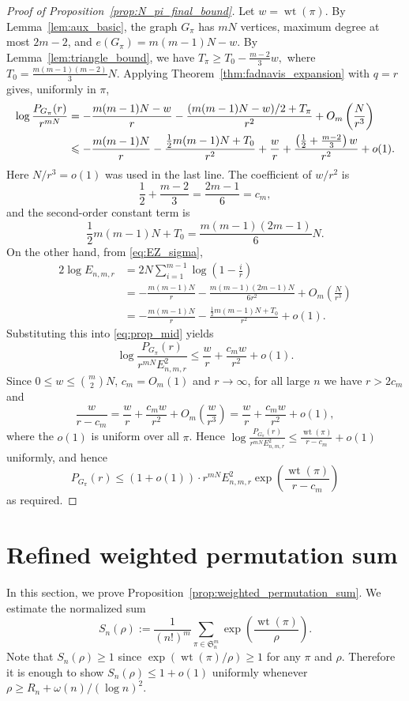 \documentclass[11pt,reqno]{amsart}
\theoremstyle{definition}
\theoremstyle{remark}
\renewcommand\leq{\leqslant}
\renewcommand\geq{\geqslant}
\renewcommand\le{\leqslant}
\renewcommand\ge{\geqslant}
\renewcommand\to{\rightarrow}
\newcommand{\wt}{\operatorname{wt}}
\begin{document}
\begin{proof}[Proof of Proposition~\ref{prop:N_pi_final_bound}]
Let $w=\wt(\pi)$. By Lemma~\ref{lem:aux_basic}, the graph $G_\pi$ has $mN$ vertices, maximum degree at most $2m-2$, and $e(G_\pi)=m(m-1)N-w.$
By Lemma~\ref{lem:triangle_bound}, we have $T_\pi\geq T_0-\frac{m-2}{3}w,$ where $T_0=\frac{m(m-1)(m-2)}3N$.
Applying Theorem~\ref{thm:fadnavis_expansion} with $q=r$ gives, uniformly in $\pi$,
\begin{align}
\log\frac{P_{G_\pi}(r)}{r^{mN}}
&=-\frac{m(m-1)N-w}{r}
  -\frac{(m(m-1)N-w)/2+T_\pi}{r^2}
  +O_m\left(\frac N{r^3}\right) \notag\\
&\leq
  -\frac{m(m-1)N}{r}
  -\frac{\frac12m(m-1)N+T_0}{r^2}
  +\frac wr+\frac{\left(\frac12+\frac{m-2}{3}\right)w}{r^2}
  +o(1). \label{eq:prop_mid}
\end{align}
Here $N/r^3=o(1)$ was used in the last line. The coefficient of $w/r^2$ is
\[
        \frac12+\frac{m-2}{3}=\frac{2m-1}{6}=c_m,
\]
and the second-order constant term is
\[
        \frac12m(m-1)N+T_0
        =\frac{m(m-1)(2m-1)}6N.
\]
On the other hand, from \eqref{eq:EZ_sigma},
\begin{align*}
2\log E_{n,m,r}
&=2N\sum_{i=1}^{m-1} \log\left(1-\frac ir\right)\\
&=-\frac{m(m-1)N}{r}
  -\frac{m(m-1)(2m-1)N}{6r^2}
  +O_m\left(\frac N{r^3}\right)\\
&=-\frac{m(m-1)N}{r}
  -\frac{\frac12m(m-1)N+T_0}{r^2}
  +o(1).
\end{align*}
Substituting this into \eqref{eq:prop_mid} yields
\[
        \log\frac{P_{G_\pi}(r)}{r^{mN}E_{n,m,r}^2}
        \leq \frac wr+\frac{c_mw}{r^2}+o(1).
\]
Since $0\leq w\leq\binom m2N$, $c_m=O_m(1)$ and $r\to\infty$, for all large $n$ we have $r>2c_m$ and
\[
\frac{w}{r-c_m}
=\frac wr+\frac{c_mw}{r^2}+O_m\left(\frac{w}{r^3}\right)
=\frac wr+\frac{c_mw}{r^2}+o(1),
\]
where the $o(1)$ is uniform over all $\pi$. Hence
$\log\frac{P_{G_\pi}(r)}{r^{mN}E_{n,m,r}^2}
 \le \frac{\wt(\pi)}{r-c_m}+o(1)$ uniformly, and hence
$$P_{G_\pi}(r)\le (1+o(1))\cdot r^{mN}E_{n,m,r}^2
\exp\left(\frac{\wt(\pi)}{r-c_m}\right)$$
as required.
\end{proof}
\medskip

\section{Refined weighted permutation sum}\label{sec:weighted_permutation_sum}

In this section, we prove Proposition~\ref{prop:weighted_permutation_sum}. We estimate the normalized sum
\begin{equation}\label{eq:core_sum}
        S_n(\rho):=\frac1{(n!)^m}
        \sum_{\pi\in\mathfrak S_n^m}\exp\left(\frac{\wt(\pi)}\rho\right).
\end{equation}
Note that $S_n(\rho)\geq 1$ since $\exp(\wt(\pi)/\rho)\geq1$ for any $\pi$ and $\rho$. Therefore it is enough to show 
$S_n(\rho)\leq 1+o(1)$ uniformly whenever \(\rho\ge R_n+\omega(n)/(\log n)^2\). 
\end{document}
